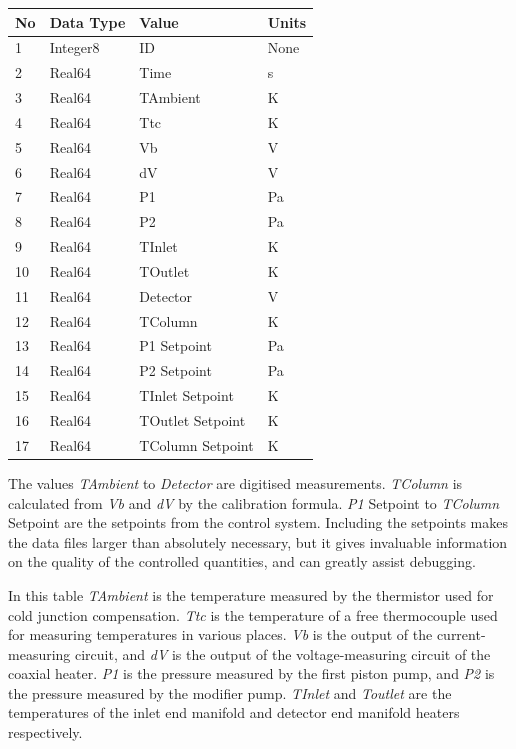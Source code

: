 \documentclass[aip,rsi,preprint,graphicx]{revtex4-1} %
\begin{document}
\begin{table}
\begin{tabular}{|l|l|l|l|}
\hline
No & Data Type & Value & Units \\
\hline
1 & Integer8 & ID & None \\
2 & Real64 & Time & s \\
3 & Real64 & TAmbient & K  \\
4 & Real64 & Ttc & K \\
5 & Real64 & Vb & V \\
6 & Real64 & dV & V \\
7 & Real64 & P1 & Pa \\
8 & Real64 & P2 & Pa \\
9 & Real64 & TInlet & K \\
10 & Real64 & TOutlet & K \\
11 & Real64 & Detector & V \\
12 & Real64 & TColumn & K \\
13 & Real64 & P1 Setpoint & Pa \\
14 & Real64 & P2 Setpoint & Pa \\
15 & Real64 & TInlet Setpoint & K \\
16 & Real64 & TOutlet Setpoint & K \\
17 & Real64 & TColumn Setpoint & K \\
\hline
\end{tabular}
\end{table}

The values {\it TAmbient} to {\it Detector} are digitised measurements. {\it TColumn} is calculated from {\it Vb} and {\it dV} by the calibration formula. {\it P1} Setpoint to {\it TColumn} Setpoint are the setpoints from the control system. Including the setpoints makes the data files larger than absolutely necessary, but it gives invaluable information on the quality of the controlled quantities, and can greatly assist debugging.

In this table {\it TAmbient} is the temperature measured by the thermistor used for cold junction compensation. {\it Ttc} is the temperature of a free thermocouple used for measuring temperatures in various places. {\it Vb} is the output of the current-measuring circuit, and {\it dV} is the output of the voltage-measuring circuit of the coaxial heater. {\it P1} is the pressure measured by the first piston pump, and {\it P2} is the pressure measured by the modifier pump. {\it TInlet} and {\it Toutlet} are the temperatures of the inlet end manifold and detector end manifold heaters respectively. 
\end{document}
